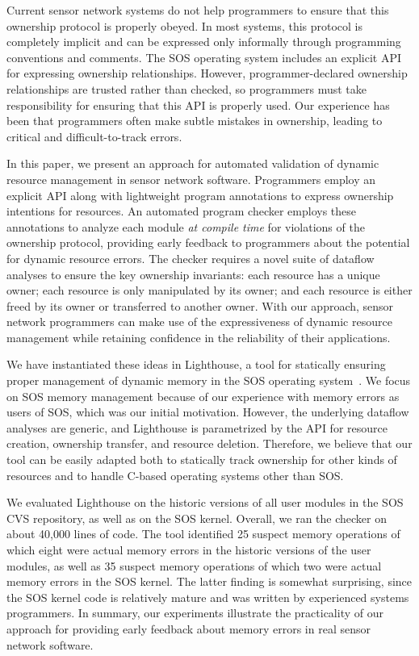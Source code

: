 Current sensor network systems do not help programmers to ensure that
this ownership protocol is properly obeyed.  In most systems, this
protocol is completely implicit and can be expressed only informally
through programming conventions and comments.  The SOS operating
system includes an explicit API for expressing ownership
relationships.  However, programmer-declared ownership relationships
are trusted rather than checked, so programmers must take responsibility for
ensuring that this API is properly used.  Our experience has been that
programmers often make subtle mistakes in ownership,
leading to critical and difficult-to-track errors.  

In this paper, we present an approach for automated validation of dynamic
resource management in sensor network software.  Programmers employ an
explicit API along with lightweight program annotations to express
ownership intentions for resources.  An automated program checker employs these
annotations to analyze each module {\em
at compile time} for violations of the ownership protocol, providing
early feedback to programmers about the potential for dynamic resource
errors.  The checker requires a novel suite of dataflow analyses to ensure
the key ownership invariants:  each resource has a unique owner; each
resource is only manipulated by its owner; and each resource is either
freed by its owner or transferred to another owner.  With our approach,
sensor network programmers can make use of the expressiveness of
dynamic resource management while retaining confidence in the
reliability of their applications.

We have instantiated these ideas in Lighthouse, a tool for statically ensuring
proper management of dynamic memory in the SOS operating
system~\cite{sos}. 
We focus on SOS memory management because of our experience with
memory errors as users of SOS, which was our initial motivation.
However, the underlying dataflow analyses are generic, and Lighthouse is
parametrized by the API for resource creation, ownership transfer, and
resource deletion.  Therefore, we believe that our tool can be easily
adapted both to statically track ownership for other kinds of
resources and to handle C-based operating systems other than SOS.

We evaluated Lighthouse on the historic versions of all user modules in
the SOS CVS repository, as well as on the SOS kernel.  Overall, we ran
the checker on about 40,000 lines of code.  The tool identified 25
suspect memory operations of which eight were actual memory errors in the
historic versions of the user modules, as well as 35 suspect memory
operations of which two were actual memory errors in the SOS kernel.
The latter finding is somewhat surprising, since the SOS kernel code
is relatively mature and was written by experienced systems programmers.
In summary, our experiments illustrate the practicality of our
approach for providing early feedback about memory errors in real
sensor network software.

